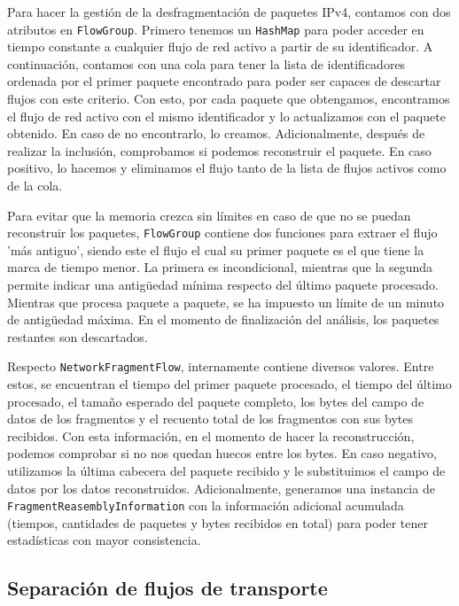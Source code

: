 Para hacer la gestión de la desfragmentación de paquetes IPv4, contamos con dos atributos en \texttt{FlowGroup}. Primero tenemos un \texttt{HashMap} para poder acceder en tiempo constante a cualquier flujo de red activo a partir de su identificador. A continuación, contamos con una cola para tener la lista de identificadores ordenada por el primer paquete encontrado para poder ser capaces de descartar flujos con este criterio. Con esto, por cada paquete que obtengamos, encontramos el flujo de red activo con el mismo identificador y lo actualizamos con el paquete obtenido. En caso de no encontrarlo, lo creamos. Adicionalmente, después de realizar la inclusión, comprobamos si podemos reconstruir el paquete. En caso positivo, lo hacemos y eliminamos el flujo tanto de la lista de flujos activos como de la cola.

Para evitar que la memoria crezca sin límites en caso de que no se puedan reconstruir los paquetes, \texttt{FlowGroup} contiene dos funciones para extraer el flujo 'más antiguo', siendo este el flujo el cual su primer paquete es el que tiene la marca de tiempo menor. La primera es incondicional, mientras que la segunda permite indicar una antigüedad mínima respecto del último paquete procesado. Mientras que procesa paquete a paquete, se ha impuesto un límite de un minuto de antigüedad máxima. En el momento de finalización del análisis, los paquetes restantes son descartados. 

Respecto \texttt{NetworkFragmentFlow}, internamente contiene diversos valores. Entre estos, se encuentran el tiempo del primer paquete procesado, el tiempo del último procesado, el tamaño esperado del paquete completo, los bytes del campo de datos de los fragmentos y el recuento total de los fragmentos con sus bytes recibidos. Con esta información, en el momento de hacer la reconstrucción, podemos comprobar si no nos quedan huecos entre los bytes. En caso negativo, utilizamos la última cabecera del paquete recibido y le substituimos el campo de datos por los datos reconstruidos. Adicionalmente, generamos una instancia de \texttt{FragmentReasemblyInformation} con la información adicional acumulada (tiempos, cantidades de paquetes y bytes recibidos en total) para poder tener estadísticas con mayor consistencia.

\subsection{Separación de flujos de transporte} \label{flowseparation}

